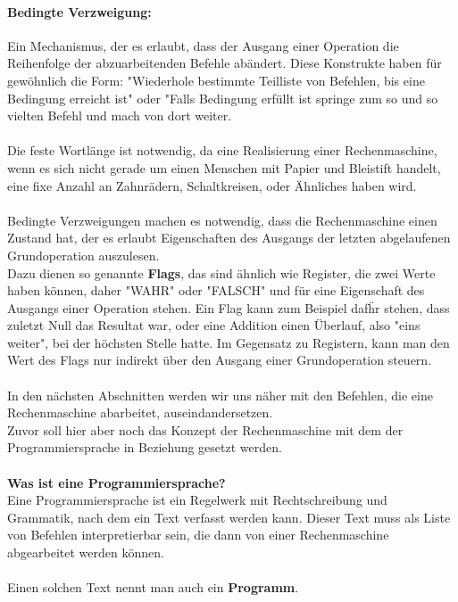 \documentclass[11pt,a4paper,leqno]{report}
\numberwithin{equation}{chapter}
\begin{document}
\paragraph{Bedingte Verzweigung:} Ein Mechanismus, der es erlaubt, dass der Ausgang einer Operation die Reihenfolge der abzuarbeitenden Befehle ab\"andert. Diese Konstrukte haben f\"ur gew\"ohnlich die Form: "Wiederhole bestimmte Teilliste von Befehlen, bis eine Bedingung erreicht ist" oder "Falls Bedingung erf\"ullt ist springe zum so und so vielten Befehl und mach von dort weiter.
\\
\\
Die feste Wortl\"ange ist notwendig, da eine Realisierung einer Rechenmaschine, wenn es sich nicht gerade um einen Menschen mit Papier und Bleistift handelt, eine fixe Anzahl an Zahnr\"adern, Schaltkreisen, oder \"Ahnliches haben wird.\\
\\
Bedingte Verzweigungen machen es notwendig, dass die Rechenmaschine einen Zustand hat, der es erlaubt Eigenschaften des Ausgangs der letzten abgelaufenen Grundoperation auszulesen. \\
Dazu dienen so genannte \textbf{Flags}, das sind \"ahnlich wie Register, die zwei Werte haben k\"onnen, daher "WAHR" oder "FALSCH" und f\"ur eine Eigenschaft des Ausgangs einer Operation stehen. Ein Flag kann zum Beispiel daf\"hr stehen, dass zuletzt Null das Resultat war, oder eine Addition einen \"Uberlauf, also "eins weiter", bei der h\"ochsten Stelle hatte. Im Gegensatz zu Registern, kann man den Wert des Flags nur indirekt \"uber den Ausgang einer Grundoperation steuern.\\
\\
In den n\"achsten Abschnitten werden wir uns n\"aher mit den Befehlen, die eine Rechenmaschine abarbeitet, auseindandersetzen. \\
Zuvor soll hier aber noch das Konzept der Rechenmaschine mit dem der Programmiersprache in Beziehung gesetzt werden.\\
\\
\textbf{Was ist eine Programmiersprache?}\\
Eine Programmiersprache ist ein Regelwerk mit Rechtschreibung und Grammatik, nach dem ein Text verfasst werden kann. Dieser Text muss als Liste von Befehlen interpretierbar sein, die dann von einer Rechenmaschine abgearbeitet werden k\"onnen.\\
\\
Einen solchen Text nennt man auch ein \textbf{Programm}.\\
\end{document}
